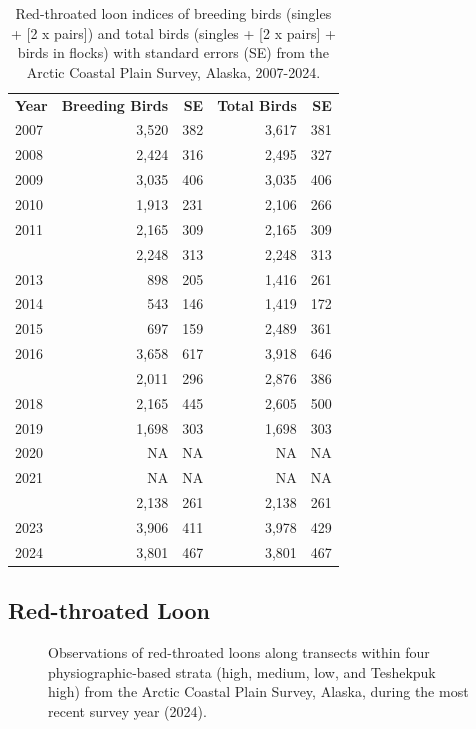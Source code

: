 \documentclass[
]{article}
\begin{document}
\begin{longtable}[t]{lrrrr}

\caption{\label{tbl-RTLO}Red-throated loon indices of breeding birds
(singles + {[}2 x pairs{]}) and total birds (singles + {[}2 x pairs{]} +
birds in flocks) with standard errors (SE) from the Arctic Coastal Plain
Survey, Alaska, 2007-2024.}

\tabularnewline

\\
\toprule
\textbf{Year} & \textbf{Breeding Birds} & \textbf{SE} & \textbf{Total Birds} & \textbf{SE}\\
\midrule
2007 & 3,520 & 382 & 3,617 & 381\\
2008 & 2,424 & 316 & 2,495 & 327\\
2009 & 3,035 & 406 & 3,035 & 406\\
2010 & 1,913 & 231 & 2,106 & 266\\
2011 & 2,165 & 309 & 2,165 & 309\\
\addlinespace
2012 & 2,248 & 313 & 2,248 & 313\\
2013 & 898 & 205 & 1,416 & 261\\
2014 & 543 & 146 & 1,419 & 172\\
2015 & 697 & 159 & 2,489 & 361\\
2016 & 3,658 & 617 & 3,918 & 646\\
\addlinespace
2017 & 2,011 & 296 & 2,876 & 386\\
2018 & 2,165 & 445 & 2,605 & 500\\
2019 & 1,698 & 303 & 1,698 & 303\\
2020 & NA & NA & NA & NA\\
2021 & NA & NA & NA & NA\\
\addlinespace
2022 & 2,138 & 261 & 2,138 & 261\\
2023 & 3,906 & 411 & 3,978 & 429\\
2024 & 3,801 & 467 & 3,801 & 467\\
\bottomrule

\end{longtable}

\endgroup{}

\newpage{}

\subsection*{Red-throated Loon}\label{red-throated-loon-2}

\begin{figure}


\caption{\label{fig-RTLOmap}Observations of red-throated loons along
transects within four physiographic-based strata (high, medium, low, and
Teshekpuk high) from the Arctic Coastal Plain Survey, Alaska, during the
most recent survey year (2024).}

\end{figure}%
\end{document}
